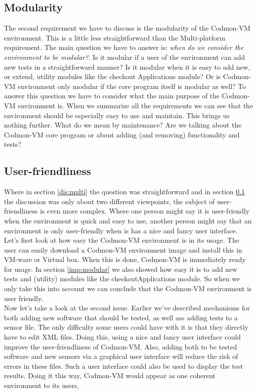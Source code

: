 \documentclass{article}
\newcommand{\project}{Codmon-VM}
\begin{document}
\subsection{Modularity}
\label{dis:modular}
The second requirement we have to discuss is the modularity of the \project{} environment. This is a little less straightforward than the Multi-platform requirement. The main question we have to answer is: 
\emph{when do we consider the environment to be modular?}. Is it modular if a user of the environment can add new tests in a straightforward manner? Is it modular when it is easy to add new, or extend, utility 
modules like the checkout Applications module? Or is \project{} environment only modular if the core program itself is modular as well? To answer this question we have to consider what the main purpose of the 
\project{} environment is. When we summarize all the requirements we can see that the environment should be especially easy to use and maintain. This brings us nothing further. What do we mean by 
maintenance? Are we talking about the \project{} core program or about adding (and removing) functionality and tests? 

\subsection{User-friendliness}
\label{dis:user}
Where in section \ref{dis:multi} the question was straightforward and in section \ref{dis:modular} the discussion was only about two different viewpoints, the subject of user-friendliness is even more complex. 
Where one person might say it is user-friendly when the environment is quick and easy to use, another person might say that an environment is only user-friendly when is has a nice and fancy user interface.\\

\noindent Let's first look at how easy the \project{} environment is in its usage. The user can easily download a \project{} environment image and install this in VM-ware or Virtual box. When this is done, 
\project{} is immediately ready for usage. In section \ref{imp:modular} we also showed how easy it is to add new tests and (utility) modules like the checkoutApplications module. So when we only take this into 
account we can conclude that the \project{} environment is user friendly.\\

\noindent Now let's take a look at the second issue. Earlier we've described mechanisms for both adding new software that should be tested, as well ass adding tests to a sensor file. The only difficulty 
some users could have with it is that they directly have to edit XML files. Doing this, using a nice and fancy user interface could improve the user-friendliness of \project{}. Also, adding both to be 
tested software and new sensors via a graphical user interface will reduce the risk of errors in these files. Such a user interface could also be used to display the test results. Doing it this way, 
\project{} would appear as one coherent environment to its users.\\
\end{document}
